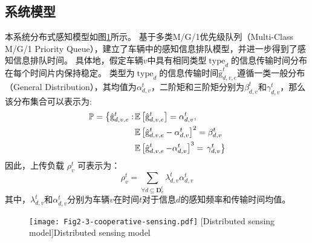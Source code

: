 \subsection[\hspace{-2pt}系统模型]{{ \hspace{-8pt}系统模型}}
本系统分布式感知模型如图\ref{fig 2-3}所示。
基于多类M/G/1优先级队列（Multi-Class M/G/1 Priority Queue）\cite{qian2020minimizing}，建立了车辆中的感知信息排队模型，并进一步得到了感知信息排队时间。
具体地，假定车辆$v$中具有相同类型$\operatorname{type}_d$的信息传输时间分布在每个时间片内保持稳定。
类型为$\operatorname{type}_d$的信息传输时间$\operatorname{\hat{g}}_{d, v, e}^t$遵循一类一般分布（General Distribution），其均值为$\alpha_{d, v}^t$，二阶矩和三阶矩分别为$\beta_{d, v}^t$和$\gamma_{d, v}^t$，那么该分布集合可以表示为:
\begin{align}
	\mathbb{P}=\left\{\hat{\mathrm{g}}_{d, v, e}^t:\right. & \mathbb{E}\left[\hat{\mathrm{g}}_{d, v, e}^t\right]=\alpha_{d, v}^t, \notag \\
	& \mathbb{E}\left[\hat{\mathrm{g}}_{d, v, e}^t-\alpha_{d, v}^t\right]^2=\beta_{d, v}^t \notag \\
	& \mathbb{E}\left[\operatorname{\hat{g}}_{d, v, e}^t-\alpha_{d, v}^t\right]^{3}=\left.\gamma_{d, v}^t \right\}
\end{align}
因此，上传负载 $\rho_{v}^{t}$ 可表示为：
\begin{equation}
    \rho_{v}^{t}=\sum_{\forall d \subseteq \mathbf{D}_v^t} \lambda_{d,v}^{t}  \alpha_{d, v}^t
\end{equation}
\noindent 其中，$\lambda_{d,v}^{t}$和$\alpha_{d, v}^t$分别为车辆$v$在时间$t$对于信息$d$的感知频率和传输时间均值。

\begin{figure}[h]
\centering
  \texttt{[image: Fig2-3-cooperative-sensing.pdf]}
  [Distributed sensing model]{Distributed sensing model}
  \label{fig 2-3}
\end{figure}

